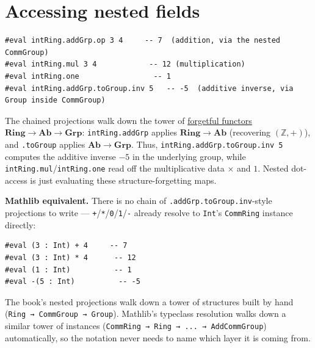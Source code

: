 \section{Accessing nested fields}\label{sec:08-rings:06-accessing-fields:1}

\begin{lstlisting}
#eval intRing.addGrp.op 3 4     -- 7  (addition, via the nested CommGroup)
#eval intRing.mul 3 4            -- 12 (multiplication)
#eval intRing.one                 -- 1
#eval intRing.addGrp.toGroup.inv 5   -- -5  (additive inverse, via Group inside CommGroup)
\end{lstlisting}

\begin{mathreading}

The chained projections walk down the tower of \hyperref[sec:01-basics:04-terminology:1]{forgetful functors} \(\mathbf{Ring} \to \mathbf{Ab} \to \mathbf{Grp}\): \texttt{intRing.addGrp} applies \(\mathbf{Ring}\to\mathbf{Ab}\) (recovering \((\mathbb{Z},
+)\)), and \texttt{.toGroup} applies \(\mathbf{Ab}\to\mathbf{Grp}\). Thus, \texttt{intRing.addGrp.toGroup.inv 5} computes the additive inverse \(-5\) in the underlying group, while \texttt{intRing.mul}/\texttt{intRing.one} read off the multiplicative data \(\times\) and \(1\). Nested dot-access is just evaluating these structure-forgetting maps.

\end{mathreading}

\textbf{Mathlib equivalent.} There is no chain of \texttt{.addGrp.toGroup.inv}-style projections to write --- \texttt{+}/\texttt{*}/\texttt{0}/\texttt{1}/\texttt{-\allowbreak{}} already resolve to \texttt{Int}'s \texttt{CommRing} instance directly:

\begin{lstlisting}
#eval (3 : Int) + 4     -- 7
#eval (3 : Int) * 4      -- 12
#eval (1 : Int)          -- 1
#eval -(5 : Int)          -- -5
\end{lstlisting}

The book's nested projections walk down a tower of structures built by hand (\texttt{Ring → CommGroup → Group}). Mathlib's typeclass resolution walks down a similar tower of instances (\texttt{CommRing → Ring → ... → AddCommGroup}) automatically, so the notation never needs to name which layer it is coming from.
